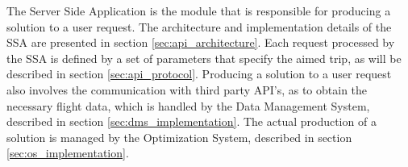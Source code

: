 The Server Side Application is the module that is responsible for producing a solution to a user request. The architecture and implementation details of the SSA are presented in section \ref{sec:api_architecture}. Each request processed by the SSA is defined by a set of parameters that specify the aimed trip, as will be described in section \ref{sec:api_protocol}. Producing a solution to a user request also involves the communication with third party API's, as to obtain the necessary flight data, which is handled by the Data Management System, described in section \ref{sec:dms_implementation}. The actual production of a solution is managed by the Optimization System, described in section \ref{sec:os_implementation}. 


